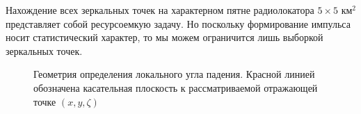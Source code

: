 Нахождение всех зеркальных точек на характерном пятне радиолокатора  $5\times
5 \text{ км}^2$ представляет собой ресурсоемкую задачу. Но поскольку формирование
импульса носит статистический характер, то мы можем ограничится лишь выборкой зеркальных точек. 





\begin{figure}[h!]
    \centering
    \def\svgwidth{0.75\linewidth}
    
    \caption{Геометрия определения локального угла падения. Красной линией
    обозначена касательная плоскость к рассматриваемой отражающей точке
$(x,y,\zeta)$}
    \label{fig:local_theta}
\end{figure}

